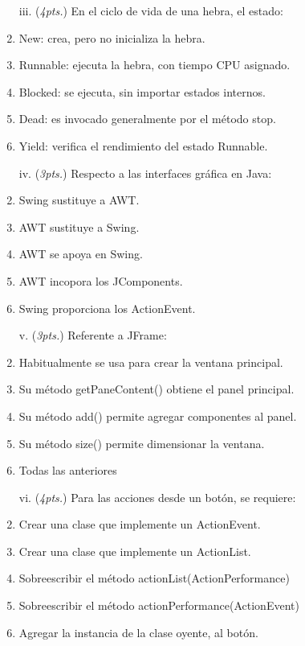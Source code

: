 \documentclass[10pt]{article}
\begin{document}
{\begin{enumerate}
\begin{multicols}{2}
    \begin{enumerate}[label=(\alph*)]
        \item[iii.] (\emph{4pts.}) En el ciclo de vida de una hebra, el estado: 
        \item New: crea, pero no inicializa la hebra.
        \item Runnable: ejecuta la hebra, con tiempo CPU asignado.
        \item Blocked: se ejecuta, sin importar estados internos.
        \item Dead: es invocado generalmente por el m\'etodo stop.
        \item Yield: verifica el rendimiento del estado Runnable.
    \end{enumerate}

    \begin{enumerate}[label=(\alph*)]
        \item[iv.] (\emph{3pts.}) Respecto a las interfaces gr\'afica en Java:
        \item Swing sustituye a AWT.
        \item AWT sustituye a Swing.
        \item AWT se apoya en Swing.
        \item AWT incopora los JComponents.
        \item Swing proporciona los ActionEvent.
    \end{enumerate}

    \begin{enumerate}[label=(\alph*)]
        \item[v.] (\emph{3pts.}) Referente a JFrame:
        \item Habitualmente se usa para crear la ventana principal.
        \item Su m\'etodo getPaneContent() obtiene el panel principal.
        \item Su m\'etodo add() permite agregar componentes al panel.
        \item Su m\'etodo size() permite dimensionar la ventana.
        \item Todas las anteriores
    \end{enumerate}

    \begin{enumerate}[label=(\alph*)]
        \item[vi.] (\emph{4pts.}) Para las acciones desde un bot\'on, se requiere:
        \item Crear una clase que implemente un ActionEvent.
        \item Crear una clase que implemente un ActionList.
        \item Sobreescribir el m\'etodo actionList(ActionPerformance)
        \item Sobreescribir el m\'etodo actionPerformance(ActionEvent)
        \item Agregar la instancia de la clase oyente, al bot\'on.
    \end{enumerate}
    

\end{multicols}
\end{enumerate}}
\end{document}
